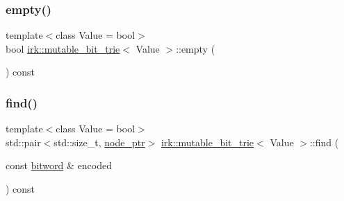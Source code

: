 \subsubsection{\texorpdfstring{empty()}{empty()}}
{\footnotesize\ttfamily template$<$class Value = bool$>$ \\
bool \mbox{\hyperlink{classirk_1_1mutable__bit__trie}{irk\+::mutable\+\_\+bit\+\_\+trie}}$<$ Value $>$\+::empty (\begin{DoxyParamCaption}{ }\end{DoxyParamCaption}) const\hspace{0.3cm}{\ttfamily [inline]}}

\mbox{\label{classirk_1_1mutable__bit__trie_af0bd766c6c437fcdcb9612ba9de84510}} 
\subsubsection{\texorpdfstring{find()}{find()}}
{\footnotesize\ttfamily template$<$class Value = bool$>$ \\
std\+::pair$<$std\+::size\+\_\+t, \mbox{\hyperlink{classirk_1_1mutable__bit__trie_abd23179ac4f02a981d4f47b4c0652287}{node\+\_\+ptr}}$>$ \mbox{\hyperlink{classirk_1_1mutable__bit__trie}{irk\+::mutable\+\_\+bit\+\_\+trie}}$<$ Value $>$\+::find (\begin{DoxyParamCaption}\item[{const \mbox{\hyperlink{namespaceirk_a979e09720c2ef05573819388a3c0e79a}{bitword}} \&}]{encoded }\end{DoxyParamCaption}) const\hspace{0.3cm}{\ttfamily [inline]}}

\mbox{\label{classirk_1_1mutable__bit__trie_a30d25f61a4f6e7cb8d9ac6f0ff205f97}} 
